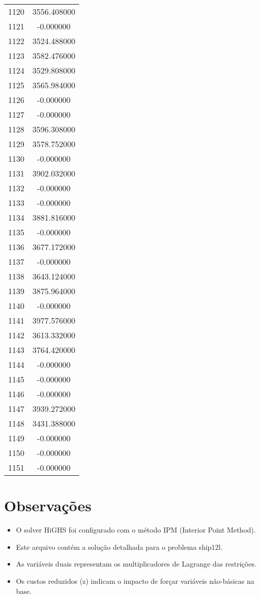 \documentclass[12pt]{article}
\begin{document}
\begin{longtable}{@{}cc@{}}
1120 & 3556.408000 \\
1121 & -0.000000 \\
1122 & 3524.488000 \\
1123 & 3582.476000 \\
1124 & 3529.808000 \\
1125 & 3565.984000 \\
1126 & -0.000000 \\
1127 & -0.000000 \\
1128 & 3596.308000 \\
1129 & 3578.752000 \\
1130 & -0.000000 \\
1131 & 3902.032000 \\
1132 & -0.000000 \\
1133 & -0.000000 \\
1134 & 3881.816000 \\
1135 & -0.000000 \\
1136 & 3677.172000 \\
1137 & -0.000000 \\
1138 & 3643.124000 \\
1139 & 3875.964000 \\
1140 & -0.000000 \\
1141 & 3977.576000 \\
1142 & 3613.332000 \\
1143 & 3764.420000 \\
1144 & -0.000000 \\
1145 & -0.000000 \\
1146 & -0.000000 \\
1147 & 3939.272000 \\
1148 & 3431.388000 \\
1149 & -0.000000 \\
1150 & -0.000000 \\
1151 & -0.000000 \\

\end{longtable}


\section{Observações}

\begin{itemize}
\item O solver HiGHS foi configurado com o método IPM (Interior Point Method).
\item Este arquivo contém a solução detalhada para o problema ship12l.
\item As variáveis duais representam os multiplicadores de Lagrange das restrições.
\item Os custos reduzidos (z) indicam o impacto de forçar variáveis não-básicas na base.
\end{itemize}
\end{document}
